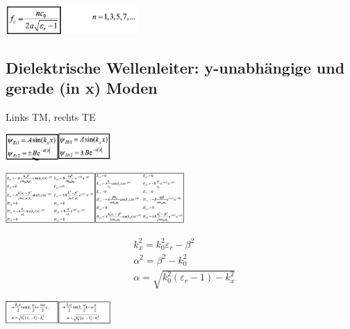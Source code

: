 \documentclass[english]{latex4ei/latex4ei_sheet}
\begin{document}
\begin{sectionbox}
	\begin{center}\includegraphics[width = 5cm]{./img/dielektr-ugfc.png}\end{center}
\end{sectionbox}
\begin{sectionbox}
	\subsection{Dielektrische Wellenleiter: y-unabhängige und gerade (in x) Moden}
	Links TM, rechts TE\\
	\begin{center}\includegraphics[width = 2cm]{./img/dielektr-gtm.png}\includegraphics[width = 2cm]{./img/dielektr-gte.png}\end{center}
	\begin{center}\includegraphics[width = 3.4cm]{./img/dielektr-gtm2.png}\includegraphics[width = 3.4cm]{./img/dielektr-gte2.png}\end{center}
	$$\begin{aligned}
		&k_{x}^{2}=k_{0}^{2} \varepsilon_{r}-\beta^{2} \\
		&\alpha^{2}=\beta^{2}-k_{0}^{2}\\
		&\alpha=\sqrt{k_{0}^{2}\left(\varepsilon_{r}-1\right)-k_{x}^{2}}
		\end{aligned}$$
	\begin{center}\includegraphics[width = 2cm]{./img/dielektr-gtm3.png}\includegraphics[width = 2cm]{./img/dielektr-gte3.png}\end{center}

\end{sectionbox}
\end{document}
